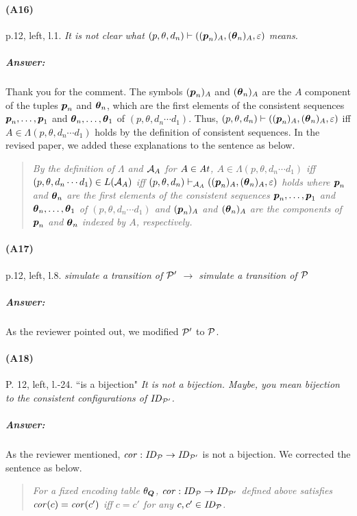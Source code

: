 \documentclass{article}
\begin{document}
\paragraph{(A16)} p.12, left, l.1.\newline
\textit{
It is not clear what $(p, \theta, d_n) \vdash (({\boldsymbol p}_n)_A, ({\boldsymbol \theta}_n)_A, \varepsilon)$ means.
}
\subparagraph{Answer:}
Thank you for the comment.
The symbols $({\boldsymbol p}_n)_A$ and $({\boldsymbol \theta}_n)_A$
are the $A$ component of the tuples ${\boldsymbol p}_n$ and ${\boldsymbol \theta}_n$,
which are the first elements of the consistent sequences
${\boldsymbol p}_n,\ldots,{\boldsymbol p}_1$ and ${\boldsymbol \theta}_n,\ldots,{\boldsymbol \theta}_1$ of $(p,\theta,d_n\cdots d_1)$.
Thus, $(p, \theta, d_n) \vdash (({\boldsymbol p}_n)_A, ({\boldsymbol \theta}_n)_A, \varepsilon)$
iff $A\in\Lambda(p,\theta,d_n\cdots d_1)$ holds
by the definition of consistent sequences.
In the revised paper, we added these explanations to the sentence as below.

\begin{quote}\em
	By the definition of $\Lambda$ and ${\cal A}_A$ for $A\in\mathit{At}$,
	$A\in\Lambda(p,\theta,d_n\cdots d_1)$ iff
	$(p,\theta,d_n\cdots d_1)\in L({\cal A}_A)$ iff
	$(p,\theta,d_n)\vdash_{{\cal A}_A}
	(({\boldsymbol p}_n)_A,({\boldsymbol \theta}_n)_A,\varepsilon)$ holds
	where
	${\boldsymbol p}_n$ and ${\boldsymbol \theta}_n$ are the first elements of
	the consistent sequences ${\boldsymbol p}_n,\ldots,{\boldsymbol p}_1$ and ${\boldsymbol \theta}_n,\ldots,{\boldsymbol \theta}_1$ of $(p,\theta,d_n\cdots d_1)$ and
	$({\boldsymbol p}_n)_A$ and $({\boldsymbol \theta}_n)_A$ are the components of ${\boldsymbol p}_n$ and ${\boldsymbol \theta}_n$ indexed by $A$, respectively.
\end{quote}

\paragraph{(A17)} p.12, left, l.8.\newline
\textit{
simulate a transition of ${\cal P}'$ $\to$ simulate a transition of ${\cal P}$
}
\subparagraph{Answer:}
As the reviewer pointed out, we modified ${\cal P}'$ to ${\cal P}$.

\paragraph{(A18)} P. 12, left, l.-24. ``is a bijection"\newline
\textit{
It is not a bijection. Maybe, you mean bijection to the consistent
configurations of $\mathit{ID}_{{\cal P}'}$.
}
\subparagraph{Answer:}
As the reviewer mentioned, $\mathit{cor}: \mathit{ID}_{\cal P} \to \mathit{ID}_{{\cal P}'}$ is not a bijection.
We corrected the sentence as below.
\begin{quote}\em
  For a fixed encoding table $\theta_{\boldsymbol Q}$, $\mathit{cor}: \mathit{ID}_{\cal P} \to \mathit{ID}_{{\cal P}'}$ defined above satisfies $\mathit{cor}(c)=\mathit{cor}(c')$ iff $c=c'$
  for any $c,c'\in\mathit{ID}_{\cal P}$.
\end{quote}
\end{document}
